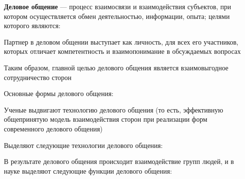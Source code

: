 \begin{definition}
    \textbf{Деловое общение} — процесс взаимосвязи и взаимодействия субъектов, при котором осуществляется обмен деятельностью, информации, опыта; целями которого являются:
    \begin{multienumerate}
    \end{multienumerate}
\end{definition}

Партнер в деловом общении выступает как личность, для всех его участников, которых отличает компетентность и взаимопонимание в обсуждаемых вопросах

Таким образом, главной целью делового общения является взаимовыгодное сотрудничество сторон

Основные формы делового общения:
\begin{multienumerate}
\end{multienumerate}

Ученые выдвигают технологию делового общения (то есть, эффективную общепринятую модель взаимодействия сторон при реализации форм современного делового общения)

Выделяют следующие технологии делового общения:
\begin{multienumerate}
\end{multienumerate}

В результате делового общения происходит взаимодействие групп людей, и в науке выделяют следующие функции делового общения:

\begin{multienumerate}
\end{multienumerate}

